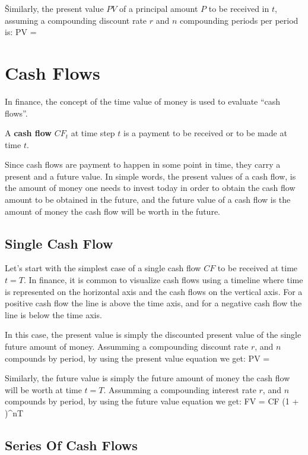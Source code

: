  \v

Similarly, the present value $PV$ of a principal amount $P$ to be received in $t$, assuming a compounding discount rate
$r$ and $n$ compounding periods per period is:
\bse
PV = 
\ese

\section{Cash Flows}

In finance, the concept of the time value of money is used to evaluate ``cash flows''.

A \textbf{cash flow} $CF_t$ at time step $t$ is a payment to be received or to be made at time $t$.
\ed

Since cash flows are payment to happen in some point in time, they carry a present and a future value. In simple words,
the present values of a cash flow, is the amount of money one needs to invest today in order to obtain the cash flow
amount to be obtained in the future, and the future value of a cash flow is the amount of money the cash flow will be
worth in the future.

\subsection{Single Cash Flow}

Let's start with the simplest case of a single cash flow $CF$ to be received at time $t=T$. In finance, it is common to
visualize cash flows using a timeline where time is represented on the horizontal axis and the cash flows on the
vertical axis. For a positive cash flow the line is above the time axis, and for a negative cash flow the line is below
the time axis.


In this case, the present value is simply the discounted present value of the single future amount of money. Assumming
a compounding discount rate $r$, and $n$ compounds by period, by using the present value equation we get:
\bse \label{eq:pv_single}
PV = 
\ese

Similarly, the future value is simply the future amount of money the cash flow will be worth at time $t=T$. Assumming a
compounding interest rate $r$, and $n$ compounds by period, by using the future value equation we get:
\bse
FV = CF \cdot (1 + )^{nT}
\ese

\subsection{Series Of Cash Flows}

